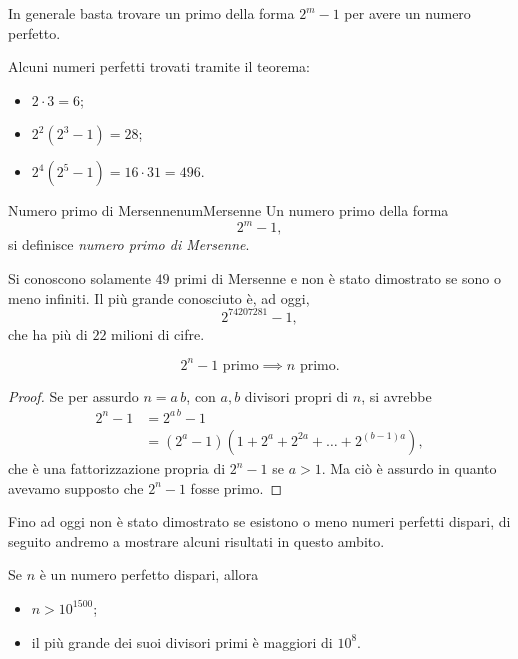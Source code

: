 \begin{oss}
	In generale basta trovare un primo della forma \(2^m-1\) per avere un numero perfetto.
\end{oss}

\begin{ese}
	Alcuni numeri perfetti trovati tramite il teorema:
	\begin{itemize}
		\item \(2\cdot 3=6\);
		\item \(2^2(2^3-1)=28\);
		\item \(2^4(2^5-1)=16\cdot 31=496\).
	\end{itemize}
\end{ese}

\begin{defn}{Numero primo di Mersenne}{numMersenne}
	Un numero primo della forma
	\[
		2^m-1,
	\]
	si definisce \emph{numero primo di Mersenne}.
\end{defn}

\begin{oss}
	Si conoscono solamente \(49\) primi di Mersenne e non è stato dimostrato se sono o meno infiniti.
	Il più grande conosciuto è, ad oggi,
	\[
		2^{74207281}-1,
	\]
	che ha più di \(22\) milioni di cifre.
\end{oss}

\begin{pr*}
	\[
		2^n-1\text{ primo}\implies n\text{ primo}.
	\]
\end{pr*}

\begin{proof}
	Se per assurdo \(n=a\,b\), con \(a,b\) divisori propri di \(n\), si avrebbe
	\[
		\begin{split}
			2^n-1 & =2^{a\,b}-1\\
			& =(2^a-1)(1+2^a+2^{2a}+\ldots+2^{(b-1)a}),
		\end{split}
	\]
	che è una fattorizzazione propria di \(2^n-1\) se \(a>1\).
	Ma ciò è assurdo in quanto avevamo supposto che \(2^n-1\) fosse primo.
\end{proof}

\begin{oss}
	Fino ad oggi non è stato dimostrato se esistono o meno numeri perfetti dispari, di seguito andremo a mostrare alcuni risultati in questo ambito.
\end{oss}

\begin{pr*}
	Se \(n\) è un numero perfetto dispari, allora
	\begin{itemize}
		\item \(n>10^{1500}\);
		\item il più grande dei suoi divisori primi è maggiori di \(10^8\).
	\end{itemize}
\end{pr*}

